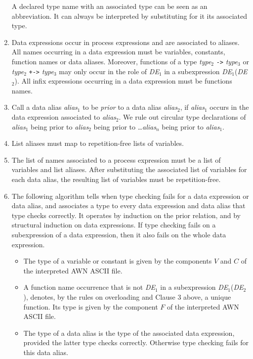 \documentclass[adraft]{eptcs}
\begin{document}
\begin{enumerate}
  A declared type name with an associated type can be seen as an abbreviation.
  It can always be interpreted by substituting for it its associated type.
\item Data expressions occur in process expressions and are associated to aliases.
  All names occurring in a data expression must be variables, constants, function names or data aliases.
  Moreover, functions of a type  \textit{type}$_2$ {\tt ->} \textit{type}$_3$ or
  \textit{type}$_2$ {\tt +->} \textit{type}$_3$ may only occur in the role of \textit{DE}$_1$ in a
  subexpression \textit{DE}$_1$(\textit{DE}$_2$).
  All infix expressions occurring in a data expression must be functions names.
\item
  Call a data alias \textit{alias}$_1$ to be \emph{prior} to a data alias
  \textit{alias}$_2$, if \textit{alias}$_1$ occurs in the data expression associated to \textit{alias}$_2$.
  We rule out circular type declarations of \textit{alias}$_1$ being prior to
  \textit{alias}$_2$ being prior to \dots \textit{alias}$_n$ being prior to \textit{alias}$_1$.
\item List aliases  must map to repetition-free lists of variables.
\item The list of names associated to a process expression must be a list of variables and list aliases.
  After substituting the associated list of variables for each data alias, the resulting list of
  variables must be repetition-free.
\item The following algorithm tells when type checking fails for a data expression or data alias,
  and associates a type to every data expression and data alias that type checks correctly.
  It operates by induction on the prior relation, and by structural induction on data expressions.
  If type checking fails on a subexpression of a data expression, then it also fails on the whole data expression.
  \begin{itemize}
  \item The type of a variable or constant is given by the components
    $V$ and $C$ of the interpreted AWN ASCII file.
  \item
    A function name occurrence that is not \textit{DE}$_1$ in a subexpression \textit{DE}$_1$(\textit{DE}$_2$),
    denotes, by the rules on overloading and Clause 3 above, a unique function. Its type is given by the component $F$ of the interpreted AWN ASCII file.
  \item The type of a data alias is the type of the associated data expression, provided the latter
    type checks correctly. Otherwise type checking fails for this data alias.

\end{itemize}
\end{enumerate}
\end{document}
